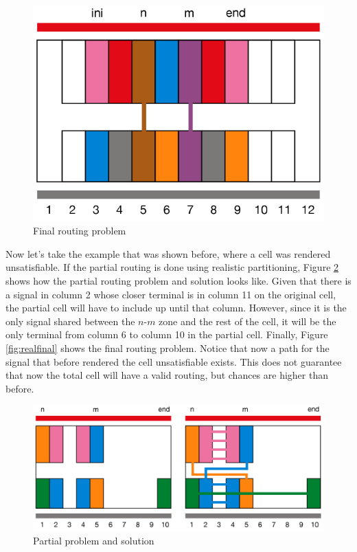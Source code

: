 \begin{figure}[h!]
  \centering
  \includegraphics[scale=0.5]{img/design/RealDivFinal.png}
  \caption{Final routing problem}
  \label{fig:RealDivFinal}
\end{figure} 


Now let's take the example that was shown before, where a cell was rendered unsatisfiable. If the partial routing is done using realistic partitioning, Figure \ref{fig:realmitja} shows how the partial routing problem and solution looks like. Given that there is a signal in column 2 whose closer terminal is in column 11 on the original cell, the partial cell will have to include up until that column. However, since it is the only signal shared between the $n$-$m$ zone and the rest of the cell, it will be the only terminal from column 6 to column 10 in the partial cell. Finally, Figure \ref{fig:realfinal} shows the final routing problem. Notice that now a path for the signal that before rendered the cell unsatisfiable exists. This does not guarantee that now the total cell will have a valid routing, but chances are higher than before. \\

\begin{figure}[h!]
  \centering
  \includegraphics[scale=0.5]{img/design/RealMitja.png}
  \caption{Partial problem and solution}
  \label{fig:realmitja}
\end{figure} 

